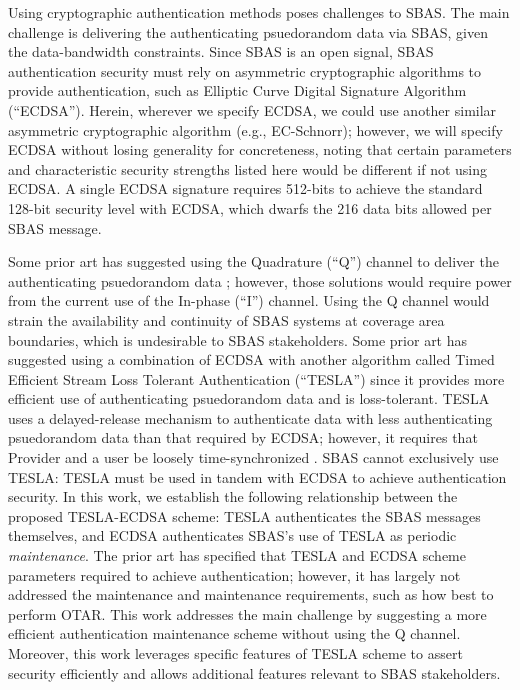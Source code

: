 \documentclass[letterpaper,times]{IONconf/IONconf}
\begin{document}
	Using cryptographic authentication methods poses challenges to SBAS.
	The main challenge is delivering the authenticating psuedorandom data via SBAS, given the data-bandwidth constraints.
	Since SBAS is an open signal, SBAS authentication security must rely on asymmetric cryptographic algorithms to provide authentication, such as Elliptic Curve Digital Signature Algorithm (``ECDSA'').
	Herein, wherever we specify ECDSA, we could use another similar asymmetric cryptographic algorithm (e.g., EC-Schnorr); however, we will specify ECDSA without losing generality for concreteness, noting that certain parameters and characteristic security strengths listed here would be different if not using ECDSA.
	A single ECDSA signature requires 512-bits to achieve the standard 128-bit security level with ECDSA, which dwarfs the 216 data bits allowed per SBAS message.

	Some prior art has suggested using the Quadrature (``Q'') channel to deliver the authenticating psuedorandom data \cite{todd-pki-scheme, other_schemes}; however, those solutions would require power from the current use of the In-phase (``I'') channel.
	Using the Q channel would strain the availability and continuity of SBAS systems at coverage area boundaries, which is undesirable to SBAS stakeholders.
	Some prior art has suggested using a combination of ECDSA with another algorithm called Timed Efficient Stream Loss Tolerant Authentication (``TESLA'') \cite{Neish_Dissertation, gal-os-tesla} since it provides more efficient use of authenticating psuedorandom data and is loss-tolerant.
	TESLA uses a delayed-release mechanism to authenticate data with less authenticating psuedorandom data than that required by ECDSA; however, it requires that Provider and a user be loosely time-synchronized \cite{perrig2005timed}.
	SBAS cannot exclusively use TESLA: TESLA must be used in tandem with ECDSA to achieve authentication security.
	In this work, we establish the following relationship between the proposed TESLA-ECDSA scheme: TESLA authenticates the SBAS messages themselves, and ECDSA authenticates SBAS's use of TESLA as periodic {\em maintenance}.
	The prior art has specified that TESLA and ECDSA scheme parameters required to achieve authentication; however, it has largely not addressed the maintenance and maintenance requirements, such as how best to perform OTAR.
	This work addresses the main challenge by suggesting a more efficient authentication maintenance scheme without using the Q channel.
	Moreover, this work leverages specific features of TESLA scheme to assert security efficiently \cite{chain-security} and allows additional features relevant to SBAS stakeholders.
\end{document}
